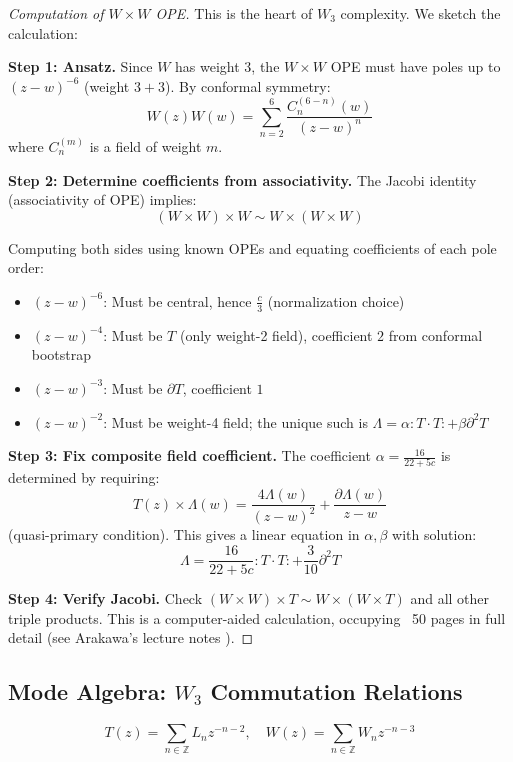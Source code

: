 \begin{proof}[Computation of $W \times W$ OPE]
This is the heart of $W_3$ complexity. We sketch the calculation:

\textbf{Step 1: Ansatz.}
Since $W$ has weight $3$, the $W \times W$ OPE must have poles up to $(z-w)^{-6}$ (weight $3+3$). By conformal symmetry:
\begin{equation}
W(z)W(w) = \sum_{n=2}^{6} \frac{C_n^{(6-n)}(w)}{(z-w)^n}
\end{equation}
where $C_n^{(m)}$ is a field of weight $m$.

\textbf{Step 2: Determine coefficients from associativity.}
The Jacobi identity (associativity of OPE) implies:
$$(W \times W) \times W \sim W \times (W \times W)$$

Computing both sides using known OPEs and equating coefficients of each pole order:
\begin{itemize}
\item $(z-w)^{-6}$: Must be central, hence $\frac{c}{3}$ (normalization choice)
\item $(z-w)^{-4}$: Must be $T$ (only weight-2 field), coefficient $2$ from conformal bootstrap
\item $(z-w)^{-3}$: Must be $\partial T$, coefficient $1$
\item $(z-w)^{-2}$: Must be weight-4 field; the unique such is $\Lambda = \alpha : T \cdot T : + \beta \partial^2 T$
\end{itemize}

\textbf{Step 3: Fix composite field coefficient.}
The coefficient $\alpha = \frac{16}{22+5c}$ is determined by requiring:
$$T(z) \times \Lambda(w) = \frac{4\Lambda(w)}{(z-w)^2} + \frac{\partial\Lambda(w)}{z-w}$$
(quasi-primary condition). This gives a linear equation in $\alpha, \beta$ with solution:
$$\Lambda = \frac{16}{22+5c} : T \cdot T : + \frac{3}{10}\partial^2 T$$

\textbf{Step 4: Verify Jacobi.}
Check $(W \times W) \times T \sim W \times (W \times T)$ and all other triple products. This is a computer-aided calculation, occupying ~50 pages in full detail (see Arakawa's lecture notes \cite{Arakawa-lectures-W}).
\end{proof}

\subsection{Mode Algebra: $W_3$ Commutation Relations}

\begin{definition}
$$T(z) = \sum_{n \in \mathbb{Z}} L_n z^{-n-2}, \quad W(z) = \sum_{n \in \mathbb{Z}} W_n z^{-n-3}$$
\end{definition}

